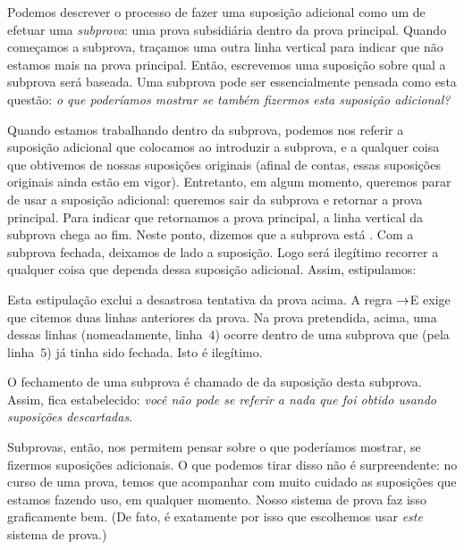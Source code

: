 Podemos descrever o processo de fazer uma suposi\c c\~ao adicional como um de efetuar  uma \emph{subprova}: uma prova subsidi\'aria dentro da prova principal. Quando come\c camos a subprova, tra\c camos uma outra linha vertical para indicar que n\~ao estamos mais na prova principal. Ent\~ao, escrevemos uma suposi\c c\~ao sobre qual a subprova ser\'a baseada.  Uma subprova pode ser essencialmente pensada como esta quest\~ao: \emph{o que poder\'iamos mostrar se tamb\'em fizermos esta suposi\c c\~ao adicional?}

Quando estamos trabalhando dentro da subprova, podemos nos referir a suposi\c c\~ao adicional que colocamos ao introduzir a subprova,  e a qualquer coisa que obtivemos de nossas suposi\c c\~oes originais (afinal de contas, essas suposi\c c\~oes originais ainda est\~ao em vigor). Entretanto, em algum momento,  queremos parar de usar a suposi\c c\~ao adicional: queremos sair da subprova e retornar a prova principal. Para indicar que retornamos a prova principal, a linha vertical da subprova chega ao fim.  Neste ponto, dizemos que a subprova est\'a . Com a subprova fechada, deixamos de lado a suposi\c c\~ao.  Logo ser\'a ileg\'itimo recorrer a qualquer coisa que dependa dessa suposi\c c\~ao adicional. Assim, estipulamos:


Esta estipula\c c\~ao exclui a desastrosa tentativa da prova acima. A regra $\rightarrow$E exige que citemos duas linhas anteriores da prova. Na prova pretendida, acima, uma dessas linhas (nomeadamente, linha~$4$)  ocorre dentro de uma subprova que (pela linha~$5$) j\'a tinha sido fechada. Isto \'e ileg\'itimo. 

O fechamento de uma subprova \'e chamado de  da suposi\c c\~ao desta subprova. Assim, fica estabelecido: \emph{voc\^e n\~ao pode se referir a nada que foi obtido usando suposi\c c\~oes descartadas}. 

Subprovas, ent\~ao, nos permitem pensar sobre o que poder\'iamos mostrar,  se fizermos suposi\c c\~oes adicionais.  O que podemos  tirar disso n\~ao \'e surpreendente: no curso de uma prova, temos que acompanhar com muito cuidado as suposi\c c\~oes que estamos fazendo uso, em qualquer momento.  Nosso sistema de prova faz isso graficamente bem. (De fato, \'e exatamente por isso que escolhemos usar  \emph{este}  sistema de prova.)

